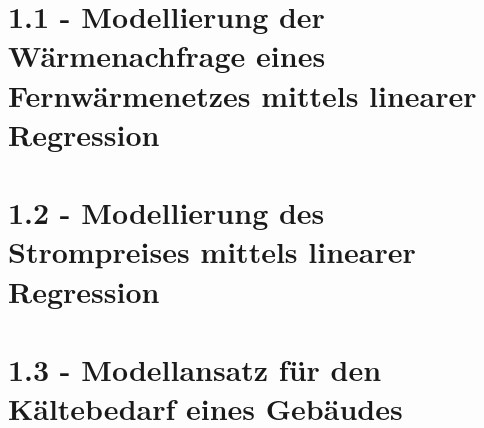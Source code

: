 \documentclass{eegreport}
\begin{document}
\mytitlepage
{} 
\tableofcontents 
{} 

\newpage


\section{1.1 - Modellierung der Wärmenachfrage eines Fernwärmenetzes mittels linearer Regression}

\section{1.2 - Modellierung des Strompreises mittels linearer Regression}

\section{1.3 - Modellansatz für den Kältebedarf eines Gebäudes}



\newpage
\appendix


\newpage

\end{document}
